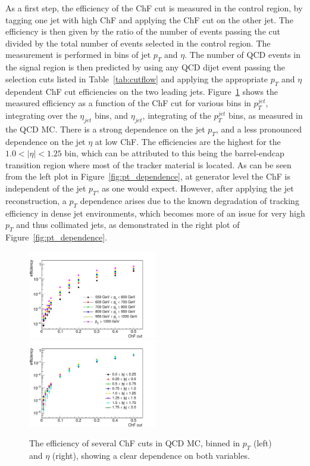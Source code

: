 As a first step, the efficiency of the ChF cut is measured in the control region, by tagging one jet with high ChF and applying the ChF cut on the other jet. The efficiency is then given by the ratio of the number of events passing the cut divided by the total number of events selected in the control region. The measurement is performed in bins of jet $p_T$ and $\eta$. The number of \ac{QCD} events in the signal region is then predicted by using any \ac{QCD} dijet event passing the selection cuts listed in Table~\ref{tab:cutflow} and applying the appropriate $p_T$ and $\eta$ dependent ChF cut efficiencies on the two leading jets. Figure~\ref{fig:efficiencies} shows the measured efficiency as a function of the ChF cut for various bins in $p_T^{jet}$, integrating over the $\eta_{jet}$ bins, and $\eta_{jet}$, integrating of the $p_T^{jet}$ bins, as measured in the \ac{QCD} MC. There is a strong dependence on the jet $p_T$, and a less pronounced dependence on the jet $\eta$ at low ChF. The efficiencies are the highest for the $1.0 < |\eta| < 1.25$ bin, which can be attributed to this being the barrel-endcap transition region where most of the tracker material is located. As can be seen from the left plot in Figure~\ref{fig:pt_dependence}, at generator level the ChF is independent of the jet $p_T$, as one would expect. However, after applying the jet reconstruction, a $p_T$ dependence arises due to the known degradation of tracking efficiency in dense jet environments, which becomes more of an issue for very high $p_T$ and thus collimated jets, as demonstrated in the right plot of Figure~\ref{fig:pt_dependence}.

\begin{figure}[ht]
  \centering
  \includegraphics[width=0.5\textwidth]{figures/eff1D_pt_newtrigger.pdf}\hfill%
  \includegraphics[width=0.5\textwidth]{figures/eff1D_eta_newtrigger.pdf}
  \caption{The efficiency of several ChF cuts in \ac{QCD} MC, binned in $p_T$ (left) and $\eta$ (right), showing a clear dependence on both variables.}
  \label{fig:efficiencies}
\end{figure}

